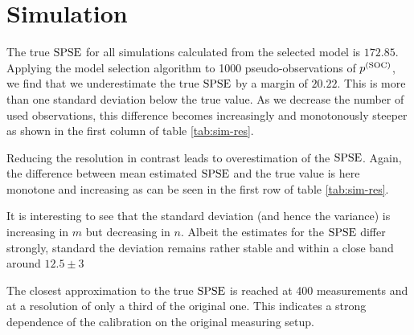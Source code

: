 \section{Simulation}
\label{sec:simulation}
	
	The true $\mathrm{SPSE}$ for all simulations calculated from the selected model is $172.85$. Applying the model selection algorithm to 1000 pseudo-observations of $p^{(\mathrm{SOC})}$, we find that we underestimate the true $\mathrm{SPSE}$ by a margin of $20.22$. 
	This is more than one standard deviation below the true value.
	As we decrease the number of used observations, this difference becomes increasingly and monotonously steeper as shown in the first column of table \ref{tab:sim-res}.
		
	
	
	Reducing the resolution in contrast leads to overestimation of the $\mathrm{SPSE}$.
	Again, the difference between mean estimated $\mathrm{SPSE}$ and the true value is here monotone and increasing as can be seen in the first row of table \ref{tab:sim-res}.
	
	It is interesting to see that the standard deviation (and hence the variance) is increasing in $m$ but decreasing in $n$.
	Albeit the estimates for the $\mathrm{SPSE}$ differ strongly, standard the deviation remains rather stable and within a close band around $12.5 \pm 3$
	
	The closest approximation to the true $\mathrm{SPSE}$ is reached at 400 measurements and at a resolution of only a third of the original one.
	This indicates a strong dependence of the calibration on the original measuring setup.

